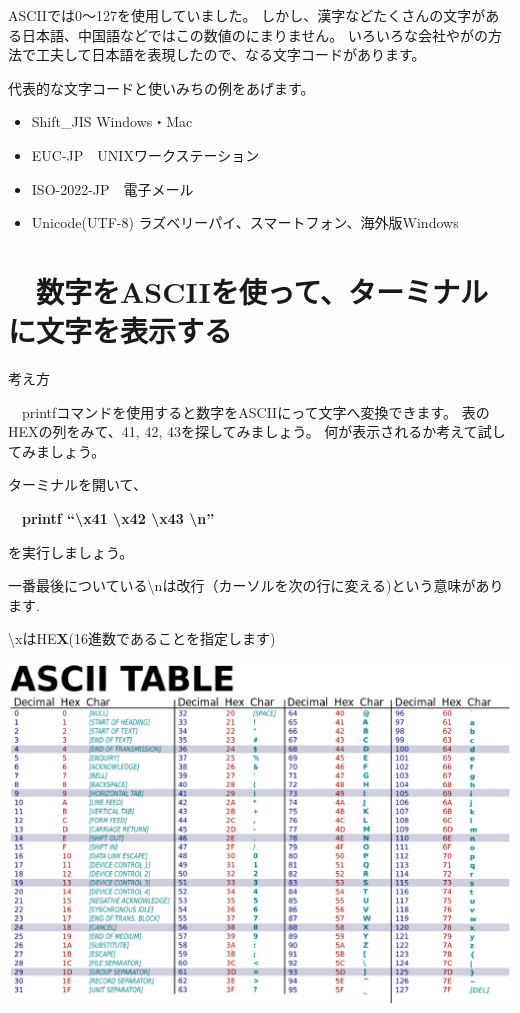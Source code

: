 \bigskip

\clearpage
ASCIIでは0〜127を使用していました。
しかし、漢字などたくさんの文字がある日本語、中国語などではこの数値のにまりません。
いろいろな会社やがの方法で工夫して日本語を表現したので、なる文字コードがあります。

代表的な文字コードと使いみちの例をあげます。

\begin{itemize}
\item Shift\_JIS Windows・Mac
\item EUC-JP　UNIXワークステーション
\item ISO-2022-JP　電子メール
\item Unicode(UTF-8)
ラズベリーパイ、スマートフォン、海外版Windows


\bigskip
\end{itemize}

\bigskip
{}
\clearpage\section{\theExercise　数字をASCIIを使って、ターミナルに文字を表示する}
\addtocounter{Exercise}{-1}\label{E:ASCII}
考え方

\ \ printfコマンドを使用すると数字をASCIIにって文字へ変換できます。
表のHEXの列をみて、41,
42,
43を探してみましょう。
何が表示されるか考えて試してみましょう。

ターミナルを開いて、

\ \ \textbf{printf “{\textbackslash}x41 {\textbackslash}x42 {\textbackslash}x43 {\textbackslash}n”}

を実行しましょう。

一番最後についている{\textbackslash}nは改行（カーソルを次の行に変える)という意味があります.

{\textbackslash}xはHE\textbf{X}(16進数であることを指定します)

\begin{center}
\includegraphics[width=\textwidth]{./text08-img/textbook-img016.eps}

\end{center}

